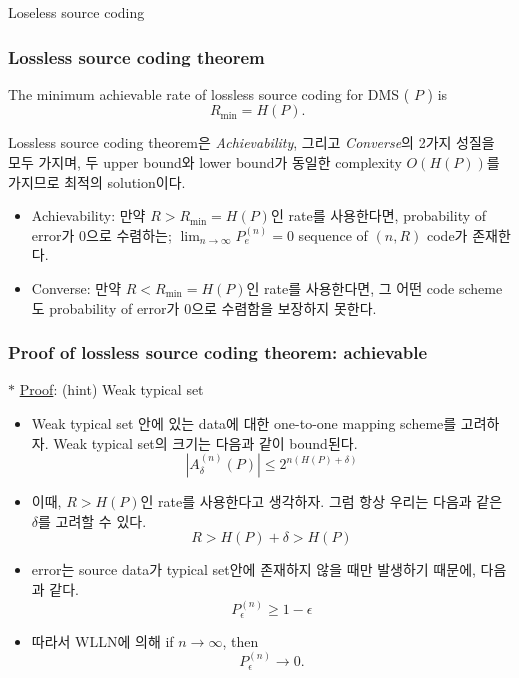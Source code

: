 \documentclass[9pt]{beamer}
\begin{document}
\begin{section}{Loseless source coding}
        \begin{frame}
            \frametitle{Lossless source coding theorem}
            \begin{theorem}
                The minimum achievable rate of lossless source coding for DMS ( $P$ ) is 
                $$ R_{\min }=H(P) \text {. } $$
            \end{theorem}
            \vspace{0.2cm}
            Lossless source coding theorem은 \textit{Achievability}, 그리고 \textit{Converse}의 2가지 성질을 모두 가지며, 두 upper bound와 lower bound가 동일한 complexity $O(H(P))$를 가지므로 최적의 solution이다. 
            \vspace{0.2cm}
            \begin{itemize}
                \item Achievability: 만약 $R > R_{\min} = H(P)$인 rate를 사용한다면, probability of error가 0으로 수렴하는; $\lim_{n\rightarrow \infty} P_{e}^{(n)} = 0$ sequence of $(n, R)$ code가 존재한다.
                \item Converse: 만약 $R < R_{\min} = H(P)$인 rate를 사용한다면, 그 어떤 code scheme도 probability of error가 0으로 수렴함을 보장하지 못한다. 
            \end{itemize}
        \end{frame}


        \begin{frame}
            \frametitle{Proof of lossless source coding theorem: achievable}
            $\ast$ \underline{Proof}: (hint) Weak typical set
            \vspace{0.2cm}
            \begin{itemize}
                \item Weak typical set 안에 있는 data에 대한 one-to-one mapping scheme를 고려하자. Weak typical set의 크기는 다음과 같이 bound된다.
                $$ |A_{\delta}^{(n)} (P)| \le 2^{n(H(P)+\delta)}$$
                \item 이때, $R > H(P)$인 rate를 사용한다고 생각하자. 그럼 항상 우리는 다음과 같은 $\delta$를 고려할 수 있다.
                $$R > H(P) + \delta > H(P)$$
                \item error는 source data가 typical set안에 존재하지 않을 때만 발생하기 때문에, 다음과 같다.
                $$P^{(n)}_{\epsilon} \ge 1- \epsilon$$
                \item 따라서 WLLN에 의해 if $n \rightarrow \infty$, then
                $$ P^{(n)}_{\epsilon} \rightarrow 0.$$
            \end{itemize}
        \end{frame}


\end{section}
\end{document}
